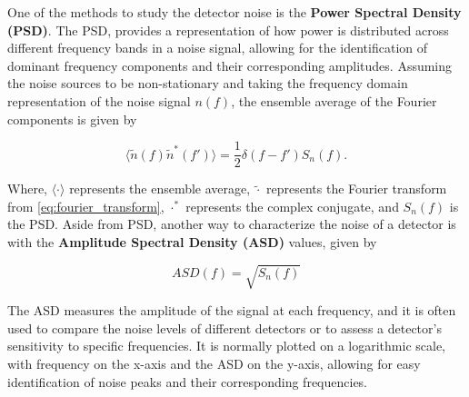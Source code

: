 \documentclass[12pt]{article}
\begin{document}



\noindent One of the  methods to study the detector noise is the \textbf{Power Spectral Density (PSD)}. The PSD, provides a representation of how power is distributed across different frequency bands in a noise signal\cite{Oppenheim_2009}, allowing for the identification of dominant frequency components and their corresponding amplitudes. Assuming the noise sources to be non-stationary and taking the frequency domain representation of the noise signal $n(f)$, the ensemble average of the Fourier components is given by \cite{Li:2013lza}

\begin{equation}
  \langle \tilde{n}(f) \tilde{n}^*(f') \rangle = \frac{1}{2} \delta(f - f') S_n(f).
  \label{eq:psd_relation}
\end{equation}

\medskip
\noindent Where, $\langle \cdot \rangle$ represents the ensemble average, $\tilde{\cdot}$ represents the Fourier transform from \ref{eq:fourier_transform}, $\cdot^\ast$ represents the complex conjugate, and $S_n(f)$ is the PSD. Aside from PSD, another way to characterize the noise of a detector is with the \textbf{Amplitude Spectral Density (ASD)} values, given by

\begin{equation}
  ASD(f) = \sqrt{S_n(f)}
\end{equation}

\noindent The ASD measures the amplitude of the signal at each frequency, and it is often used to compare the noise levels of different detectors or to assess a detector's sensitivity to specific frequencies. It is normally plotted on a logarithmic scale, with frequency on the x-axis and the ASD on the y-axis, allowing for easy identification of noise peaks and their corresponding frequencies.
\end{document}
